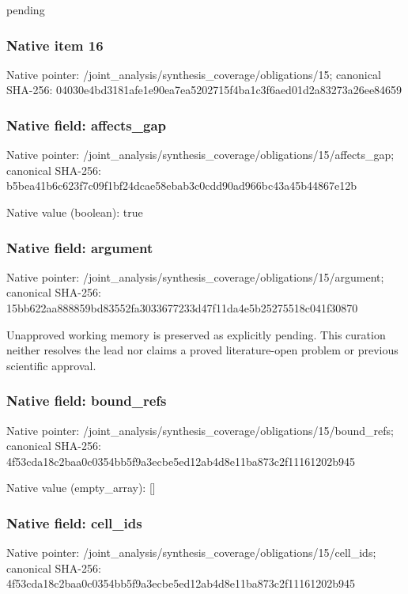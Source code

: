 \documentclass[10pt,a4paper]{article}
\begin{document}
\begingroup\raggedright\sloppy pending\par\endgroup

\subsubsection{Native item 16}
Native pointer: /joint\_\allowbreak{}analysis/synthesis\_\allowbreak{}coverage/obligations/15; canonical SHA-256: 04030e4bd3181afe1e90ea7ea5202715f4ba1c3f6aed01d2a83273a26ee84659

\subsubsection{Native field: affects\_\allowbreak{}gap}
Native pointer: /joint\_\allowbreak{}analysis/synthesis\_\allowbreak{}coverage/obligations/15/affects\_\allowbreak{}gap; canonical SHA-256: b5bea41b6c623f7c09f1bf24dcae58ebab3c0cdd90ad966bc43a45b44867e12b

Native value (boolean): true

\subsubsection{Native field: argument}
Native pointer: /joint\_\allowbreak{}analysis/synthesis\_\allowbreak{}coverage/obligations/15/argument; canonical SHA-256: 15bb622aa888859bd83552fa3033677233d47f11da4e5b25275518c041f30870

\begingroup\raggedright\sloppy Unapproved working memory is preserved as explicitly pending. This curation neither resolves the lead nor claims a proved literature-open problem or previous scientific approval.\par\endgroup

\subsubsection{Native field: bound\_\allowbreak{}refs}
Native pointer: /joint\_\allowbreak{}analysis/synthesis\_\allowbreak{}coverage/obligations/15/bound\_\allowbreak{}refs; canonical SHA-256: 4f53cda18c2baa0c0354bb5f9a3ecbe5ed12ab4d8e11ba873c2f11161202b945

Native value (empty\_\allowbreak{}array): []

\subsubsection{Native field: cell\_\allowbreak{}ids}
Native pointer: /joint\_\allowbreak{}analysis/synthesis\_\allowbreak{}coverage/obligations/15/cell\_\allowbreak{}ids; canonical SHA-256: 4f53cda18c2baa0c0354bb5f9a3ecbe5ed12ab4d8e11ba873c2f11161202b945
\end{document}
